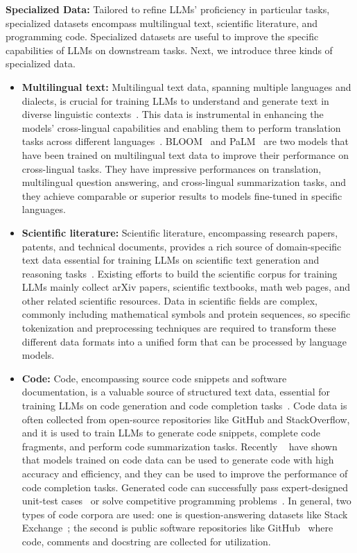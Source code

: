\textbf{Specialized Data:} Tailored to refine LLMs' proficiency in particular tasks, specialized datasets encompass multilingual text, scientific literature, and programming code.
Specialized datasets are useful to improve the specific capabilities of LLMs on downstream tasks.
Next, we introduce three kinds of specialized data.
\begin{itemize}
	\item \textbf{Multilingual text:} {
		      Multilingual text data, spanning multiple languages and dialects, is crucial for training LLMs to understand and generate text in diverse linguistic contexts~\cite{survey}. This data is instrumental in enhancing the models' cross-lingual capabilities and enabling them to perform translation tasks across different languages~\cite{survey}.
		      BLOOM~\cite{workshop2023bloom} and PaLM~\cite{chowdhery2022palm} are two models that have been trained on multilingual text data to improve their performance on cross-lingual tasks. They have impressive performances on translation, multilingual question answering, and cross-lingual summarization tasks, and they achieve comparable or superior results to models fine-tuned in specific languages.
	      }
	\item \textbf{Scientific literature:} {
		      Scientific literature, encompassing research papers, patents, and technical documents, provides a rich source of domain-specific text data essential for training LLMs on scientific text generation and reasoning tasks~\cite{survey, taylor2022galactica, lewkowycz2022minerva}.
		      Existing efforts to build the scientific corpus for training LLMs mainly collect arXiv papers, scientific textbooks, math web pages, and other related scientific resources.
		      Data in scientific fields are complex, commonly including mathematical symbols and protein sequences, so specific tokenization and preprocessing techniques are required to transform these different data formats into a unified form that can be processed by language models.
	      }
	\item \textbf{Code:} {
		      Code, encompassing source code snippets and software documentation, is a valuable source of structured text data, essential for training LLMs on code generation and code completion tasks~\cite{survey, nijkamp2022codegen}.
		      Code data is often collected from open-source repositories like GitHub and StackOverflow, and it is used to train LLMs to generate code snippets, complete code fragments, and perform code summarization tasks.
		      Recently ~\textcite{chen2021evaluating, austin2021program} have shown that models trained on code data can be used to generate code with high accuracy and efficiency, and they can be used to improve the performance of code completion tasks. Generated code can successfully pass expert-designed unit-test cases~\cite{chen2021evaluating} or solve competitive programming problems~\cite{li2022competition}.
		      In general, two types of code corpora are used: one is question-answering datasets like Stack Exchange~\cite{xu2022systematic}; the second is public software repositories like GitHub~\cite{chen2021evaluating} where code, comments and docstring are collected for utilization.
	      }
\end{itemize}

